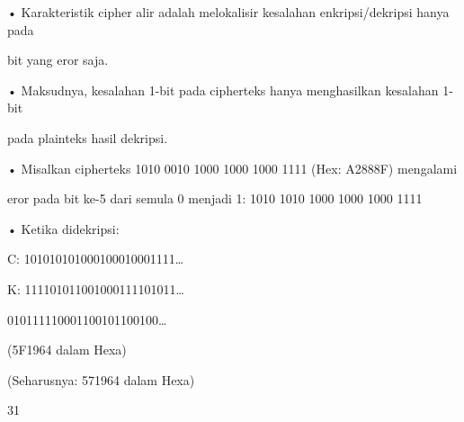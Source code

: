 \documentclass{article}
\begin{document}

• Karakteristik cipher alir adalah melokalisir kesalahan enkripsi/dekripsi hanya pada 

bit yang eror saja.

• Maksudnya, kesalahan 1-bit pada cipherteks hanya menghasilkan kesalahan 1-bit 

pada plainteks hasil dekripsi.

• Misalkan cipherteks 1010 0010 1000 1000 1000 1111 (Hex: A2888F) mengalami 

eror pada bit ke-5 dari semula 0 menjadi 1: 1010 1010 1000 1000 1000 1111 

• Ketika didekripsi:

                    C:   101010101000100010001111…

                  K:  111101011001000111101011…    


010111110001100101100100…   

(5F1964 dalam Hexa) 

                                                                                          (Seharusnya: 571964 dalam Hexa)

31
\end{document}
